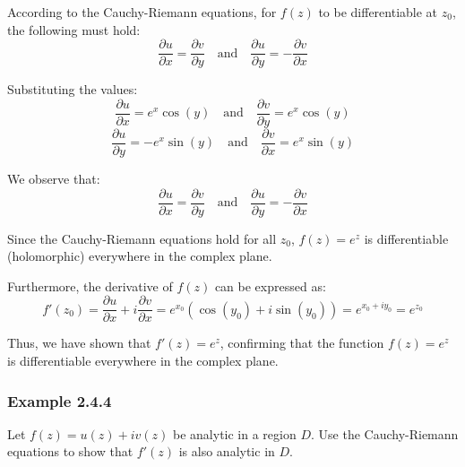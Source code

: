 \documentclass[12pt]{book}
\newcommand{\pypx}[2]{\frac{\partial #1}{\partial #2}}
\begin{document}
According to the Cauchy-Riemann equations, for \( f(z) \) to be differentiable at \( z_0 \), the following must hold:
\[
\pypx{u}{x} = \pypx{v}{y} \quad \text{and} \quad \pypx{u}{y} = -\pypx{v}{x}
\]

Substituting the values:
\[
\pypx{u}{x} = e^x \cos(y) \quad \text{and} \quad \pypx{v}{y} = e^x \cos(y)
\]
\[
\pypx{u}{y} = -e^x \sin(y) \quad \text{and} \quad \pypx{v}{x} = e^x \sin(y)
\]

We observe that:
\[
\pypx{u}{x} = \pypx{v}{y} \quad \text{and} \quad \pypx{u}{y} = -\pypx{v}{x}
\]

Since the Cauchy-Riemann equations hold for all \( z_0 \), \( f(z) = e^z \) is differentiable (holomorphic) everywhere in the complex plane.

Furthermore, the derivative of \( f(z) \) can be expressed as:
\[
f'(z_0) = \pypx{u}{x} + i \pypx{v}{x} = e^{x_0} \left( \cos(y_0) + i \sin(y_0) \right) = e^{x_0 + iy_0} = e^{z_0}
\]

Thus, we have shown that \( f'(z) = e^z \), confirming that the function \( f(z) = e^z \) is differentiable everywhere in the complex plane.

\subsubsection{Example 2.4.4}
Let $f(z) = u(z) + iv(z)$ be analytic in a region $D$.  Use the Cauchy-Riemann equations to show that $f'(z)$ is also analytic in $D$. 
\end{document}
